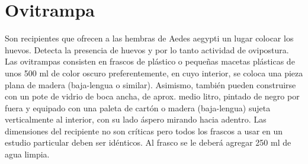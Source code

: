 \section{Ovitrampa}
\label{sec:densidad-vectorial-ovitrampa}
Son recipientes que ofrecen a las hembras de Aedes aegypti un lugar colocar
los huevos. Detecta la presencia de huevos y por lo tanto actividad de
ovipostura. Las ovitrampas consisten en frascos de plástico o pequeñas
macetas plásticas de unos 500 ml de color oscuro preferentemente, en cuyo
interior, se coloca una pieza plana de madera (baja-lengua o similar).
Asimismo, también pueden construirse con un pote de vidrio de boca ancha,
de aprox. medio litro, pintado de negro por fuera y equipado con una paleta
de cartón o madera (baja-lengua) sujeta verticalmente al interior, con su
lado áspero mirando hacia adentro. Las dimensiones del recipiente no son
críticas pero todos los frascos a usar en un estudio particular deben ser
idénticos. Al frasco se le deberá agregar 250 ml de agua limpia.
